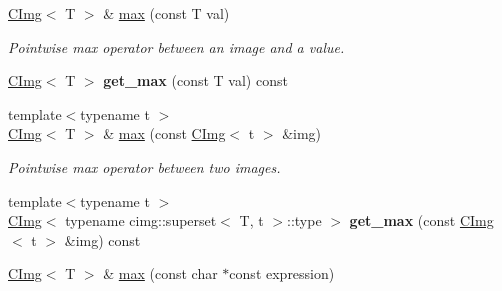 \begin{DoxyCompactItemize}
\item 
\hypertarget{structcimg__library_1_1CImg_a88c9c06c49658060a2766f865e14c0eb}{
\hyperlink{structcimg__library_1_1CImg}{CImg}$<$ T $>$ \& \hyperlink{structcimg__library_1_1CImg_a88c9c06c49658060a2766f865e14c0eb}{max} (const T val)}
\label{structcimg__library_1_1CImg_a88c9c06c49658060a2766f865e14c0eb}

\begin{DoxyCompactList}\small\item\em Pointwise max operator between an image and a value. \item\end{DoxyCompactList}\item 
\hypertarget{structcimg__library_1_1CImg_a8fdf90232d0442414467e5253c5cb663}{
\hyperlink{structcimg__library_1_1CImg}{CImg}$<$ T $>$ {\bfseries get\_\-max} (const T val) const }
\label{structcimg__library_1_1CImg_a8fdf90232d0442414467e5253c5cb663}

\item 
\hypertarget{structcimg__library_1_1CImg_abbbf6afa836f43dd613d680e9920d858}{
{\footnotesize template$<$typename t $>$ }\\\hyperlink{structcimg__library_1_1CImg}{CImg}$<$ T $>$ \& \hyperlink{structcimg__library_1_1CImg_abbbf6afa836f43dd613d680e9920d858}{max} (const \hyperlink{structcimg__library_1_1CImg}{CImg}$<$ t $>$ \&img)}
\label{structcimg__library_1_1CImg_abbbf6afa836f43dd613d680e9920d858}

\begin{DoxyCompactList}\small\item\em Pointwise max operator between two images. \item\end{DoxyCompactList}\item 
\hypertarget{structcimg__library_1_1CImg_a99e44a64d5aca6c9613cac3bd2779f60}{
{\footnotesize template$<$typename t $>$ }\\\hyperlink{structcimg__library_1_1CImg}{CImg}$<$ typename cimg::superset$<$ T, t $>$::type $>$ {\bfseries get\_\-max} (const \hyperlink{structcimg__library_1_1CImg}{CImg}$<$ t $>$ \&img) const }
\label{structcimg__library_1_1CImg_a99e44a64d5aca6c9613cac3bd2779f60}

\item 
\hypertarget{structcimg__library_1_1CImg_a66e2885da48dd6e3aba90b1a090a7891}{
\hyperlink{structcimg__library_1_1CImg}{CImg}$<$ T $>$ \& \hyperlink{structcimg__library_1_1CImg_a66e2885da48dd6e3aba90b1a090a7891}{max} (const char $\ast$const expression)}
\label{structcimg__library_1_1CImg_a66e2885da48dd6e3aba90b1a090a7891}


\end{DoxyCompactItemize}

